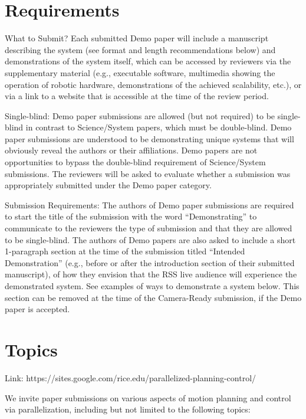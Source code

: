 \documentclass[conference]{IEEEtran}
\begin{document}





\section{Requirements} 
What to Submit? Each submitted Demo paper will include a manuscript describing the system (see format and length recommendations below) and demonstrations of the system itself, which can be accessed by reviewers via the supplementary material (e.g., executable software, multimedia showing the operation of robotic hardware, demonstrations of the achieved scalability, etc.), or via a link to a website that is accessible at the time of the review period.

Single-blind: Demo paper submissions are allowed (but not required) to be single-blind in contrast to Science/System papers, which must be double-blind. Demo paper submissions are understood to be demonstrating unique systems that will obviously reveal the authors or their affiliations. Demo papers are not opportunities to bypass the double-blind requirement of Science/System submissions. The reviewers will be asked to evaluate whether a submission was appropriately submitted under the Demo paper category.

Submission Requirements: The authors of Demo paper submissions are required to start the title of the submission with the word “Demonstrating” to communicate to the reviewers the type of submission and that they are allowed to be single-blind. The authors of Demo papers are also asked to include a short 1-paragraph section at the time of the submission titled “Intended Demonstration” (e.g., before or after the introduction section of their submitted manuscript), of how they envision that the RSS live audience will experience the demonstrated system. See examples of ways to demonstrate a system below. This section can be removed at the time of the Camera-Ready submission, if the Demo paper is accepted.

\section{Topics}
Link: https://sites.google.com/rice.edu/parallelized-planning-control/

We invite paper submissions on various aspects of motion planning and control via parallelization, including but not limited to the following topics:
\end{document}
